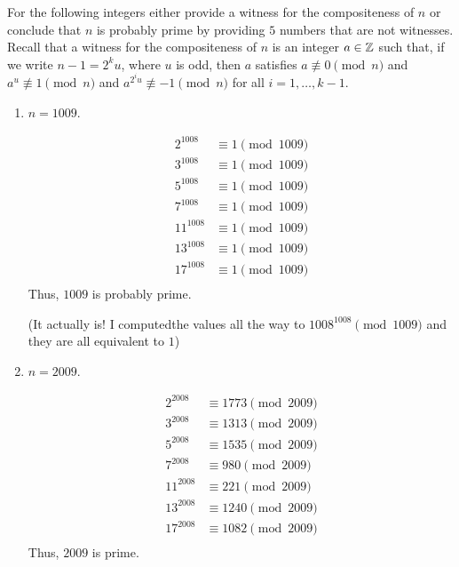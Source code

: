 \begin{problem}
  For the following integers either provide a witness for the
  compositeness of $n$ or conclude that $n$ is probably prime by
  providing $5$ numbers that are not witnesses.  Recall that a witness
  for the compositeness of $n$ is an integer $a \in \mathbb{Z}$ such that, if we
  write $n-1 = 2^k u$, where $u$ is odd, then $a$ satisfies $a
  \not\equiv 0 \pmod n$ and  $a^{u} \not\equiv 1 \pmod n$
  and $a^{2^i u} \not\equiv -1 \pmod n$ for all $i = 1, \dotsc, k-1$.
  \begin{enumerate}\renewcommand{\itemsep}{3mm}
    \item $n=1009$.
      \begin{Answer}
        \begin{align*}
          2^{1008} &\equiv 1 \pmod{1009} \\
          3^{1008} &\equiv 1 \pmod{1009} \\
          5^{1008} &\equiv 1 \pmod{1009} \\
          7^{1008} &\equiv 1 \pmod{1009} \\
          11^{1008} &\equiv 1 \pmod{1009} \\
          13^{1008} &\equiv 1 \pmod{1009} \\
          17^{1008} &\equiv 1 \pmod{1009} \\
        \end{align*}
        \noindent
        Thus, $1009$ is probably prime. 
        
        \noindent
        (It actually is! I computedthe values
        all the way to $1008^{1008} \pmod {1009}$ and they  are all equivalent to $1$)
      \end{Answer}
    \item $n=2009$.
    \begin{Answer}
      \begin{align*}
        2^{2008} &\equiv 1773 \pmod{2009} \\
        3^{2008} &\equiv 1313 \pmod{2009} \\
        5^{2008} &\equiv 1535 \pmod{2009} \\
        7^{2008} &\equiv 980 \pmod{2009} \\
        11^{2008} &\equiv 221 \pmod{2009} \\
        13^{2008} &\equiv 1240 \pmod{2009} \\
        17^{2008} &\equiv 1082 \pmod{2009} \\
      \end{align*}
      \noindent
      Thus, $2009$ is  prime.
    \end{Answer}
  \end{enumerate}
\end{problem}
